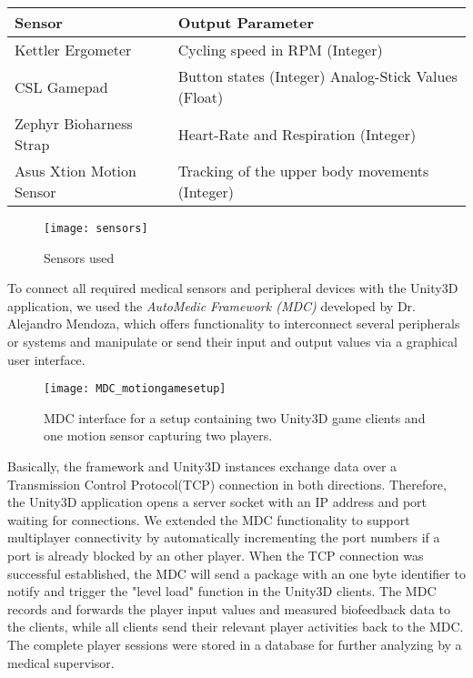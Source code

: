 \begin{multicols}{2}
\begin{center}
\begin{tabular}{ | C{2cm}  | C{4.25cm} | } \hline
    Sensor & Output Parameter \\ \hline
 	Kettler Ergometer & Cycling speed in RPM (Integer) \\ \hline
    CSL Gamepad & Button states (Integer) Analog-Stick Values (Float) \\ \hline
    Zephyr Bioharness Strap & Heart-Rate and Respiration (Integer) \\ \hline
    Asus Xtion Motion Sensor & Tracking of the upper body movements (Integer) \\ \hline    
    \end{tabular}

\end{center}

\begin{figure}[H]
  \centering
    \texttt{[image: sensors]}
 \caption{Sensors used}
\end{figure}

To connect all required medical sensors and peripheral devices with the Unity3D application, we used the \emph{AutoMedic Framework (MDC)} developed by Dr. Alejandro Mendoza\cite{Mendoza2011AutoMedic}, which offers functionality to interconnect several peripherals or systems and manipulate or send their input and output values via a graphical user interface.
\begin{figure}[H]
  \centering
    \texttt{[image: MDC\_motiongamesetup]}
 \caption{MDC interface for a setup containing two Unity3D game clients and one motion sensor capturing two players.}
\end{figure}

 Basically, the framework and Unity3D instances exchange data over a Transmission Control Protocol(TCP) connection in both directions. Therefore, the Unity3D application opens a server socket with an IP address and port waiting for connections. We extended the MDC functionality to support multiplayer connectivity by automatically incrementing the port numbers if a port is already blocked by an other player. When the TCP connection was successful established, the MDC will send a package with an one byte identifier to notify and trigger the "level load" function in the Unity3D clients. The MDC records and forwards the player input values and measured biofeedback data to the clients, while all clients send their relevant player activities back to the MDC. The complete player sessions were stored in a database for further analyzing by a medical supervisor.




\end{multicols}
